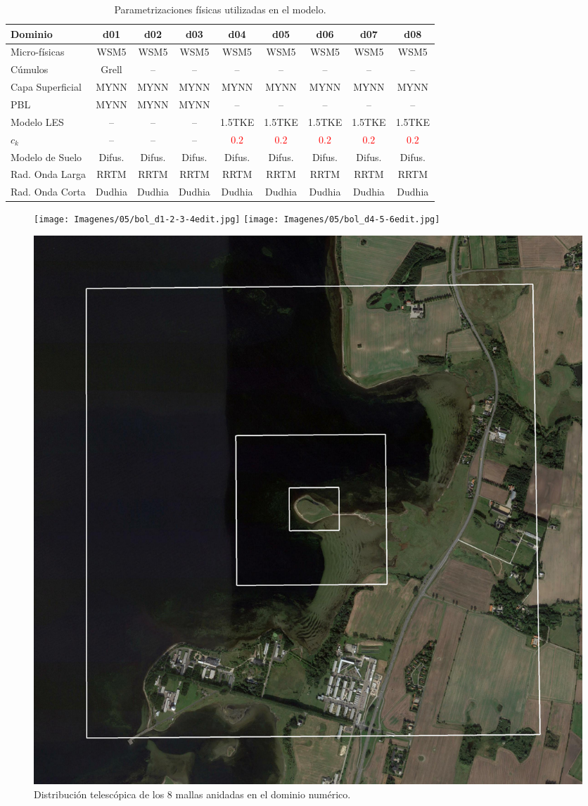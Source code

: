 \begin{table}[H]
	\caption{Parametrizaciones físicas utilizadas en el modelo.}\label{tab:05_param_bol}
	\centering\footnotesize
	\begin{tabular}{lcccccccc}
		\toprule
		Dominio 				& d01	&	d02	&	d03	&	d04	&	d05	&	d06 &	d07& d08\\
		\midrule
		Micro-físicas		 	& WSM5 & WSM5 & WSM5 &WSM5&WSM5&WSM5&WSM5& WSM5 \\
		Cúmulos			 		& Grell & -- & -- & -- & -- & -- & -- & -- \\ 
		Capa Superficial	 	& MYNN & MYNN & MYNN & MYNN & MYNN & MYNN & MYNN& MYNN\\
		PBL				 		& MYNN & MYNN & MYNN & -- & -- & -- & -- &--\\
		Modelo LES				 		& -- & -- & -- & 1.5TKE & 1.5TKE & 1.5TKE & 1.5TKE& 1.5TKE \\
		$c_k$				 		& -- & -- & -- & \textcolor{red}{$0.2$} & \textcolor{red}{$0.2$} & \textcolor{red}{$0.2$} & \textcolor{red}{$0.2$}& \textcolor{red}{$0.2$} \\
		Modelo de Suelo 		& Difus. & Difus. & Difus. & Difus. & Difus. & Difus. & Difus.& Difus. \\
		Rad. Onda Larga	& RRTM &RRTM&RRTM&RRTM&RRTM&RRTM&RRTM& RRTM\\
		Rad. Onda Corta	& Dudhia &Dudhia&Dudhia&Dudhia&Dudhia&Dudhia&Dudhia& Dudhia\\
		\bottomrule
	\end{tabular}
\end{table}

\begin{figure}[H]
	\centering
	\texttt{[image: Imagenes/05/bol\_d1-2-3-4edit.jpg]}
	\texttt{[image: Imagenes/05/bol\_d4-5-6edit.jpg]}
	
	\bigskip
	\includegraphics[width=0.6\linewidth,page=1,trim={5mm 3mm 3mm 3mm},clip,frame]{Imagenes/05/bol_d6-7-8edit.jpg}%
	
	\caption{Distribución telescópica de los 8 mallas anidadas en el dominio numérico.}
	\label{fig:05_dom_bol}
\end{figure}



